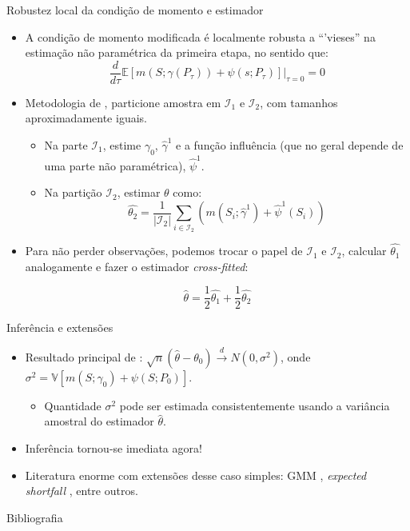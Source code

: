 \documentclass[11pt]{beamer}
\begin{document}
\begin{frame}{Robustez local da condição de momento e estimador}
\begin{itemize}
	\item A condição de momento modificada é localmente robusta a ``'vieses'' na estimação não paramétrica da primeira etapa, no sentido que:
	$$\frac{d}{d \tau} \mathbb{E}[m(S;\gamma(P_{\tau})) + \psi(s;P_{\tau})]\Big|_{\tau=0} = 0$$
	\item Metodologia de \cite{Chernozhukov2018}, particione amostra em $\mathcal{I}_1$ e $\mathcal{I}_2$, com tamanhos aproximadamente iguais.
	\begin{itemize}
		\item Na parte $\mathcal{I}_1$, estime $\gamma_0$, $\hat{\gamma}^1$ e a função influência (que no geral depende de uma parte não paramétrica), $\hat{\psi}^1$.
		\item Na partição $\mathcal{I}_2$, estimar $\theta$ como:
		\begin{equation}
			\hat{\theta_2} = \frac{1}{|\mathcal{I}_2|}\sum_{i\in \mathcal{I}_2} (m(S_i;\hat{\gamma}^1) + \hat{\psi}^1(S_i))
		\end{equation}
	\end{itemize}
	\item Para não perder observações, podemos trocar o papel de $\mathcal{I}_1$ e $\mathcal{I}_2$, calcular $\hat{\theta_1}$ analogamente e fazer o estimador \textit{cross-fitted}:
	
	$$\hat{\theta} = \frac{1}{2} \hat{\theta_1} + \frac{1}{2} \hat{\theta_2}$$

\end{itemize}
\end{frame}

\begin{frame}{Inferência e extensões}
	\begin{itemize}

		\item Resultado principal de \cite{Chernozhukov2018}: $\sqrt{n}(\hat{\theta} - \theta_0) \overset{d}{\to}N(0, \sigma^2)$, onde $\sigma^2 = \mathbb{V}[m(S;\gamma_0) + \psi(S;P_0)]$.
	\begin{itemize}
		\item Quantidade $\sigma^2$ pode ser estimada consistentemente usando a variância amostral do estimador $\hat{\theta}$.
	\end{itemize}
	\item Inferência tornou-se imediata agora!
	\item Literatura enorme com extensões desse caso simples: GMM \citep{Chernozhukov2018,Chernozhukov2022},  \textit{expected shortfall }\citep{chetverikov2022weightedaverage}, entre outros.
	\end{itemize}
\end{frame}
\appendix
\begin{frame}[allowframebreaks]{Bibliografia}
	\printbibliography
	
\end{frame}
\end{document}
